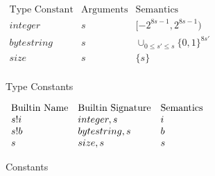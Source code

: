 \documentclass[../main.tex]{subfiles}
\begin{document}
\begin{figure*}[t]


    \(\begin{array}{lllll}
        \textrm{Type Constant} & \textrm{Arguments} & \textrm{Semantics}\\

        integer & s & [-2^{8s-1},2^{8s-1})\\

        bytestring & s & \cup_{0\leq s' \leq s}\{0,1\}^{8s'}\\

        size & s & \{s\}\\
   \end{array}\)
   \caption{Type Constants}
   \label{fig:Plutus_core_type_constants}

\end{figure*}

\begin{figure*}
   \(\begin{array}{lllll}
        \textrm{Builtin Name} & \textrm{Builtin Signature} & \textrm{Semantics}\\
        s!i   & integer,s & i\\
        s!b   & bytestring,s & b\\
        s     & size,s & s\\
    \end{array}\)
    \caption{Constants}
    \label{fig:Plutus_core_constants}
\end{figure*}
\end{document}
